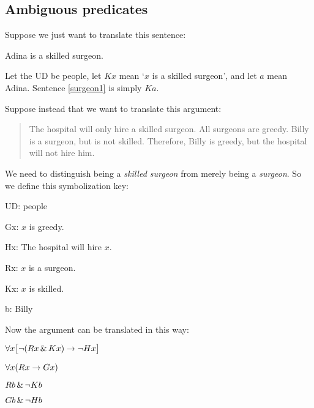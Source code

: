 \subsection{Ambiguous predicates}

Suppose we just want to translate this sentence:
\begin{earg}
\item[\ex{surgeon1}] Adina is a skilled surgeon.
\end{earg}
Let the UD be people, let $Kx$ mean `$x$ is a skilled surgeon', and let $a$ mean Adina. Sentence \ref{surgeon1} is simply $Ka$.


Suppose instead that we want to translate this argument:
\begin{quote}
The hospital will only hire a skilled surgeon. All surgeons are greedy. Billy is a surgeon, but is not skilled. Therefore, Billy is greedy, but the hospital will not hire him.
\end{quote}
We need to distinguish being a \emph{skilled surgeon} from merely being a \emph{surgeon}. So we define this symbolization key:
\begin{ekey}
\item[UD:] people
\item[Gx:] $x$ is greedy.
\item[Hx:] The hospital will hire $x$.
\item[Rx:] $x$ is a surgeon.
\item[Kx:] $x$ is skilled.
\item[b:] Billy
\end{ekey}

Now the argument can be translated in this way:
\begin{earg}
\label{surgeon2}
\item[] $\forall x\bigl[\neg (Rx \,\&\, Kx) \rightarrow \neg Hx\bigr]$
\item[] $\forall x(Rx \rightarrow Gx)$
\item[] $Rb \,\&\, \neg Kb$
\item[\therefore] $Gb \,\&\, \neg Hb$
\end{earg}


